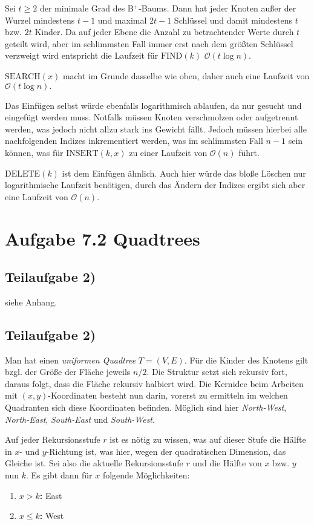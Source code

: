 \documentclass[a4paper, fontsize=10pt]{scrartcl}
\begin{document}
Sei $t\geq 2$ der minimale Grad des B$^+$-Baums. Dann hat jeder Knoten außer der Wurzel mindestens $t-1$ und maximal $2t-1$ Schlüssel und damit mindestens $t$ bzw. $2t$ Kinder. Da auf jeder Ebene die Anzahl zu betrachtender Werte durch $t$ geteilt wird, aber im schlimmsten Fall immer erst nach dem größten Schlüssel verzweigt wird entspricht die Laufzeit für \textbf{$\textrm{FIND}(k)$} $\mathcal{O}(t\log n).$\smallskip

\textbf{$\textrm{SEARCH}(x)$} macht im Grunde dasselbe wie oben, daher auch eine Laufzeit von $\mathcal{O}(t\log n).$\smallskip

Das Einfügen selbst würde ebenfalls logarithmisch ablaufen, da nur gesucht und eingefügt werden muss. Notfalls müssen Knoten verschmolzen oder aufgetrennt werden, was jedoch nicht allzu stark ins Gewicht fällt. Jedoch müssen hierbei alle nachfolgenden Indizes inkrementiert werden, was im schlimmsten Fall $n-1$ sein können, was für \textbf{$\textrm{INSERT}(k,x)$} zu einer Laufzeit von $\mathcal{O}(n)$ führt.

\smallskip
\textbf{$\textrm{DELETE}(k)$} ist dem Einfügen ähnlich. Auch hier würde das bloße Löschen nur logarithmische Laufzeit benötigen, durch das Ändern der Indizes ergibt sich aber eine Laufzeit von $\mathcal{O}(n)$.

\section*{Aufgabe 7.2 Quadtrees}
\subsection*{Teilaufgabe 2)}
siehe Anhang.

\subsection*{Teilaufgabe 2)}

Man hat einen \emph{uniformen Quadtree} $T=(V,E)$. Für die Kinder des Knotens gilt bzgl. der Größe der Fläche jeweils $n/2$. Die Struktur setzt sich rekursiv fort, daraus folgt, dass die Fläche rekursiv halbiert wird. Die Kernidee beim Arbeiten mit $(x,y)$-Koordinaten besteht nun darin, vorerst zu ermitteln im welchen Quadranten sich diese Koordinaten befinden. Möglich sind hier \emph{North-West}, \emph{North-East}, \emph{South-East} und \emph{South-West}. 

Auf jeder Rekursionsstufe $r$ ist es nötig zu wissen, was auf dieser Stufe die Hälfte in $x$- und $y$-Richtung ist, was hier, wegen der quadratischen Dimension, das Gleiche ist. Sei also die aktuelle Rekursionsstufe $r$ und die Hälfte von $x$ bzw. $y$ nun $k$. Es gibt dann für $x$ folgende Möglichkeiten:
\begin{enumerate}
\item \textbf{$x>k$:} East
\item \textbf{$x\leq k$:} West
\end{enumerate}
\end{document}
